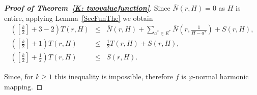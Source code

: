 \documentclass[10pt,a4paper]{amsart}
\numberwithin{equation}{section}
\begin{document}
\begin{proof}[\bf{Proof of Theorem~\ref{K: twovaluefunction}}]
Since $\overline{N}(r,H)=0$ as $H$ is entire, applying 
Lemma~\ref{SecFunThe} we obtain
\begin{eqnarray*}
  \left(\left[\frac{k}{2}\right]+3-2\right)T(r,H) 
  &\leq &\overline{N}(r,H) +\sum_{a^* \in E^*}
  \overline{N}\left(r,\frac{1}{H-a^*}\right) +S(r,H), \\
  \left(\left[\frac{k}{2}\right]+1\right)T(r,H)&\leq& 
  \frac{1}{2}T(r,H)+S(r,H),  \\
  \left(\left[\frac{k}{2}\right]+\frac{1}{2}\right)
  T(r,H) &\leq& S(r,H).
\end{eqnarray*} 

Since, for $k\geq 1$ this inequality is impossible, therefore $f$ 
is $\varphi$-normal harmonic mapping.
\end{proof}

\medskip
\end{document}

